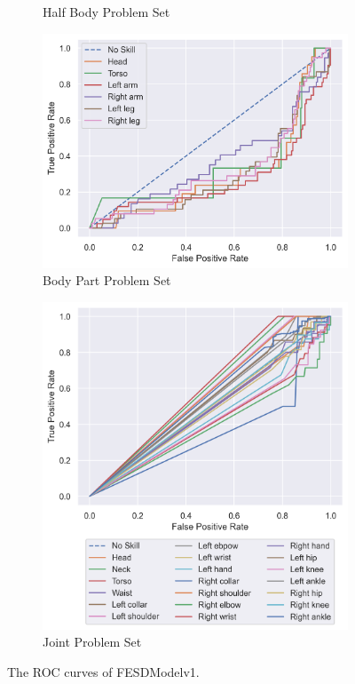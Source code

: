 \begin{figure}
\begin{subfigure}[b]{0.4\linewidth}
      \caption[]{Half Body Problem Set}
      \label{fig:hb_roc_v1}
  \end{subfigure}
  \hfill
  \begin{subfigure}[b]{0.4\linewidth}
      \centering
      \includegraphics[width=\textwidth]{figures/Results/v1/roc/bp.png}
      \caption[]{Body Part Problem Set}
      \label{fig:bp_roc_v1}
  \end{subfigure}
  \hfill
  \begin{subfigure}[b]{0.4\linewidth}
      \centering
      \includegraphics[width=\textwidth]{figures/Results/v1/roc/jt.png}
      \caption[]{Joint Problem Set}
      \label{fig:jt_roc_v1}
  \end{subfigure}
  \caption[ROC Curves of FESDModelv1]{The ROC curves of FESDModelv1.}
  \label{fig:roc_v1}
\end{figure}

